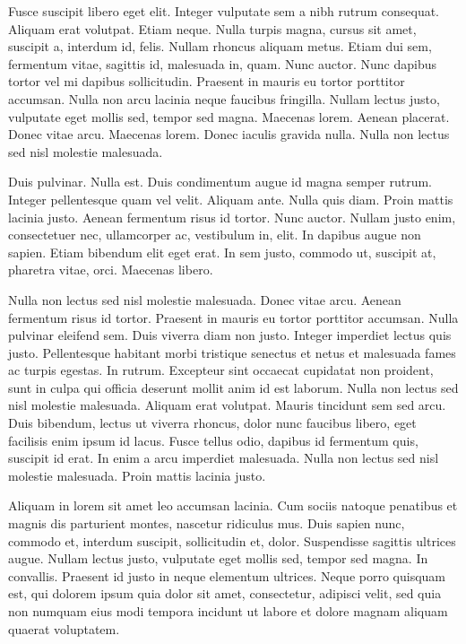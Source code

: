 Fusce suscipit libero eget elit. 
Integer vulputate sem a nibh rutrum consequat. 
Aliquam erat volutpat. 
Etiam neque. 
Nulla turpis magna, cursus sit amet, suscipit a, interdum id, felis. 
Nullam rhoncus aliquam metus. 
Etiam dui sem, fermentum vitae, sagittis id, malesuada in, quam. 
Nunc auctor. 
Nunc dapibus tortor vel mi dapibus sollicitudin. 
Praesent in mauris eu tortor porttitor accumsan. 
Nulla non arcu lacinia neque faucibus fringilla. 
Nullam lectus justo, vulputate eget mollis sed, tempor sed magna. 
Maecenas lorem. 
Aenean placerat. 
Donec vitae arcu. 
Maecenas lorem. 
Donec iaculis gravida nulla. 
Nulla non lectus sed nisl molestie malesuada.

Duis pulvinar. 
Nulla est. 
Duis condimentum augue id magna semper rutrum. 
Integer pellentesque quam vel velit. 
Aliquam ante. 
Nulla quis diam. 
Proin mattis lacinia justo. 
Aenean fermentum risus id tortor. 
Nunc auctor. 
Nullam justo enim, consectetuer nec, ullamcorper ac, vestibulum in, elit. 
In dapibus augue non sapien. 
Etiam bibendum elit eget erat. 
In sem justo, commodo ut, suscipit at, pharetra vitae, orci. 
Maecenas libero.

Nulla non lectus sed nisl molestie malesuada. 
Donec vitae arcu. 
Aenean fermentum risus id tortor. 
Praesent in mauris eu tortor porttitor accumsan. 
Nulla pulvinar eleifend sem. 
Duis viverra diam non justo. 
Integer imperdiet lectus quis justo. 
Pellentesque habitant morbi tristique senectus et netus et malesuada fames ac turpis egestas. 
In rutrum. 
Excepteur sint occaecat cupidatat non proident, sunt in culpa qui officia deserunt mollit anim id est laborum. 
Nulla non lectus sed nisl molestie malesuada. 
Aliquam erat volutpat. 
Mauris tincidunt sem sed arcu. 
Duis bibendum, lectus ut viverra rhoncus, dolor nunc faucibus libero, eget facilisis enim ipsum id lacus. 
Fusce tellus odio, dapibus id fermentum quis, suscipit id erat. 
In enim a arcu imperdiet malesuada. 
Nulla non lectus sed nisl molestie malesuada. 
Proin mattis lacinia justo.

Aliquam in lorem sit amet leo accumsan lacinia. 
Cum sociis natoque penatibus et magnis dis parturient montes, nascetur ridiculus mus. 
Duis sapien nunc, commodo et, interdum suscipit, sollicitudin et, dolor. 
Suspendisse sagittis ultrices augue. 
Nullam lectus justo, vulputate eget mollis sed, tempor sed magna. 
In convallis. 
Praesent id justo in neque elementum ultrices. 
Neque porro quisquam est, qui dolorem ipsum quia dolor sit amet, consectetur, adipisci velit, sed quia non numquam eius modi tempora incidunt ut labore et dolore magnam aliquam quaerat voluptatem.

